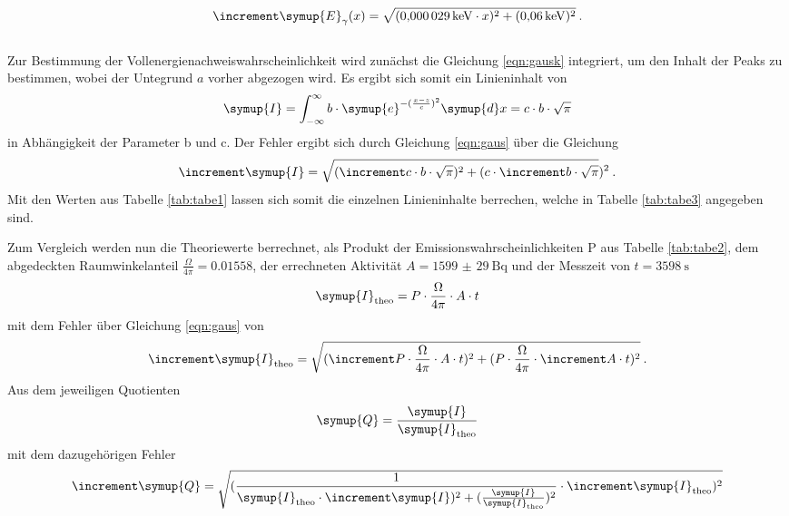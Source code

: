 \begin{equation}
   \increment \symup{E}_{\gamma} (x) =\sqrt{ (\SI{0.000029}{\kilo\electronvolt}\cdot x)^2 +
   (\SI{0.06}{\kilo\electronvolt})^2} \: .
   \label{eqn:fgerade}
\end{equation}
\\
Zur Bestimmung der Vollenergienachweiswahrscheinlichkeit wird zunächst die Gleichung \ref{eqn:gausk}
integriert, um den Inhalt der Peaks zu bestimmen, wobei der Untegrund $a$ vorher abgezogen wird.
Es ergibt sich somit ein Linieninhalt von
\begin{equation}
  \symup{I} =\int_{-\infty}^{\infty} b \cdot \symup{e}^{-(\frac{x-z}{c})^2} \symup{d}x
  = c \cdot b \cdot \sqrt{\pi}
  \label{eqn:inh}
\end{equation}
in Abhängigkeit der Parameter b und c.
Der Fehler ergibt sich durch Gleichung \ref{eqn:gaus} über die Gleichung
\begin{equation}
  \increment \symup{I} = \sqrt{ (\increment c \cdot b \cdot \sqrt{\pi})^{2}
   + (c \cdot \increment b \cdot \sqrt{\pi}})^{2} \: .
     \label{eqn:inhf}
\end{equation}
Mit den Werten aus Tabelle \ref{tab:tabe1} lassen sich somit die einzelnen Linieninhalte berrechen,
welche in Tabelle \ref{tab:tabe3} angegeben sind.

Zum Vergleich werden nun die Theoriewerte berrechnet, als Produkt
der Emissionswahrscheinlichkeiten P aus Tabelle \ref{tab:tabe2},
dem abgedeckten Raumwinkelanteil $\frac{\Omega}{4\pi}= 0.01558$, der errechneten Aktivität
$A =\SI{1599(29)}{\becquerel} $
und der Messzeit von $t = \SI{3598}{\second}$
\begin{equation}
  \symup{I}_{\text{theo}} = P\cdot \frac{\Omega}{4\pi} \cdot A \cdot t
  \label{eqn:itheo}
\end{equation}
mit dem Fehler über Gleichung \ref{eqn:gaus} von
\begin{equation}
  \increment \symup{I}_{\text{theo}} = \sqrt{ (\increment P\cdot \frac{\Omega}{4\pi} \cdot A \cdot t)^{2}
   + (P\cdot \frac{\Omega}{4\pi} \cdot \increment A \cdot t)^{2}} \: .
\end{equation}
Aus dem jeweiligen Quotienten
\begin{equation}
  \symup{Q} = \frac{\symup{I}}{\symup{I}_{\text{theo}}}
  \label{eqn:ven1}
\end{equation}
mit dem dazugehörigen Fehler
\begin{equation}
  \increment \symup{Q} = \sqrt{ (\frac{1}{\symup{I}_{\text{theo}} \cdot \increment \symup{I})^{2}
   + (\frac{\symup{I}}{\symup{I}_{\text{theo}}})^{2}}\cdot \increment \symup{I}_{\text{theo}})^{2}}
\end{equation}
